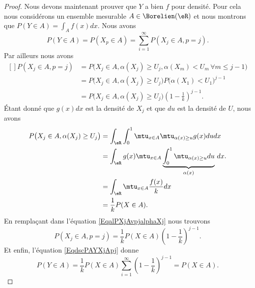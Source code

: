 \begin{proof}
	Nous devons maintenant prouver que \( Y\) a bien \( f\) pour densité. Pour cela nous considérons un ensemble mesurable \( A\in\Borelien(\eR)\) et nous montrons que \( P(Y\in A)=\int_Af(x)dx\). Nous avons
	\begin{equation}    \label{EqdscPAYXjApj}
		P(Y\in A)=P(X_p\in A)=\sum_{i=1}^{\infty}P(X_j\in A,p=j).
	\end{equation}
	Par ailleurs nous avons
	\begin{equation}        \label{EqalPXjAvpjalphaXj}
		\begin{aligned}[]
			P(X_j\in A,p=j) & =P\big( X_j\in A,\alpha(X_j)\geq U_j,\alpha(X_m)<U_m\,\forall m\leq j-1 \big)   \\
			                & =P\big( X_j\in A,\alpha(X_j)\geq U_j \big)P\big( \alpha(X_1)<U_1 \big)^{j-1}    \\
			                & =P\big( X_j\in A,\alpha(X_j)\geq U_j \big)\left( 1-\frac{1}{ k } \right)^{j-1}.
		\end{aligned}
	\end{equation}
	Étant donné que \( g(x)dx\) est la densité de \( X_j\) et que \( du\) est la densité de \( U\), nous avons
	\begin{subequations}
		\begin{align}
			P\big( X_j\in A,\alpha(X_j)\geq U_j \big) & =\int_{\eR}\int_0^1\mtu_{x\in A}\mtu_{\alpha(x)\geq u}g(x)dudx                             \\
			                                          & =\int_{\eR}g(x)\mtu_{x\in A}\underbrace{\int_0^1\mtu_{\alpha(x)\geq u}du}_{\alpha(x)}\,dx. \\
			                                          & =\int_{\eR}\mtu_{x\in A}\frac{ f(x) }{ k }dx                                               \\
			                                          & =\frac{1}{ k }P(X\in A).
		\end{align}
	\end{subequations}
	En remplaçant dans l'équation \eqref{EqalPXjAvpjalphaXj} nous trouvons
	\begin{equation}
		P(X_j\in A,p=j)=\frac{1}{ k }P(X\in A)\left( 1-\frac{1}{ k } \right)^{j-1}.
	\end{equation}
	Et enfin, l'équation \eqref{EqdscPAYXjApj} donne
	\begin{equation}
		P(Y\in A)=\frac{1}{ k }P(X\in A)\sum_{i=1}^{\infty}\left( 1-\frac{1}{ k } \right)^{j-1}=P(X\in A).
	\end{equation}
\end{proof}

